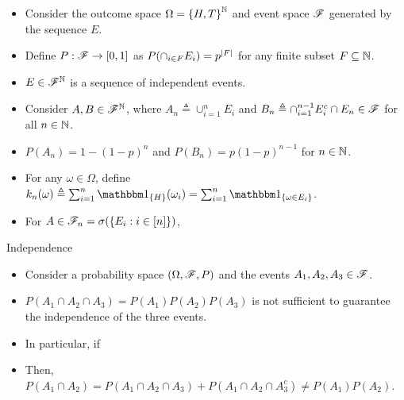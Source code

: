\documentclass[12pt,aspectratio=169]{beamer}
\begin{document}
\begin{frame}
\begin{Example} 
\begin{itemize}
\item <1-> Consider the outcome space $\Omega = \left\{H,T\right\}^{\mathbb{N}}$ and event space $\mathscr{F}$ generated by the sequence $E$.  
\item <2-> Define $P:\mathscr{F} \to [0,1]$ as $P(\cap_{i\in F}E_i)= p^{\left\lvert F\right\rvert}$ for any finite subset $F \subseteq \mathbb{N}$.  
\item <3-> $E \in \mathscr{F}^{\mathbb{N}}$ is a sequence of independent events. 
\item <4-> Consider $A, B \in \mathscr{F}^{\mathbb{N}}$, 
where $A_n \triangleq \cup_{i=1}^nE_i$ and $B_n \triangleq \cap_{i=1}^{n-1}E_i^c\cap E_n \in \mathscr{F}$ for all $n\in\mathbb{N}$.
\item <5-> $P(A_n) = 1-(1-p)^n$ and $P(B_n) = p(1-p)^{n-1}$ for $n \in \mathbb{N}$. 
\item <6-> For any $\omega \in \Omega$, define $k_n(\omega) \triangleq\sum_{i=1}^n\SetIn{H}(\omega_i) = \sum_{i=1}^n\SetIn{\omega \in E_i}$. 
\item <7-> For $A \in \mathscr{F}_n = \sigma(\left\{E_i: i \in [n]\right\})$,  
\end{itemize}
\end{Example}
\end{frame}

\begin{frame}{Independence}
\begin{Example} 
\begin{itemize}
\item <1-> Consider a probability space $(\Omega, \mathscr{F}, P)$ and the events $A_1, A_2, A_3 \in \mathscr{F}$. 
\item <2-> $P(A_1\cap A_2\cap A_3) = P(A_1)P(A_2)P(A_3)$ is not sufficient to guarantee the independence of the three events. 
\item <3-> In particular, if
\\
\item <4-> Then,\\ $P(A_1\cap A_2) =  P(A_1\cap A_2\cap A_3) + P(A_1\cap A_2\cap A_3^c) \neq P(A_1)P(A_2)$.
\end{itemize}
\end{Example} 
\end{frame}
\end{document}
